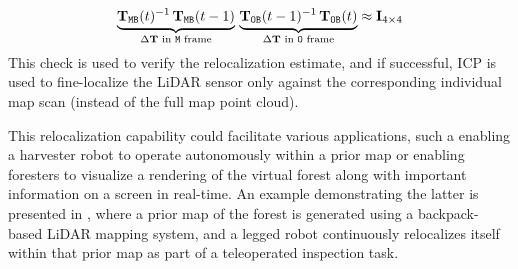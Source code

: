 \begin{equation}
  \label{eq:cycle-relocalization}
  \underbrace{\mathbf{T}_{\mathtt{M}\mathtt{B}}(t)^{-1}\, \mathbf{T}_{\mathtt{M}\mathtt{B}}(t-1)}_{\Delta\mathbf{T} \text{ in $\mathtt{M}$ frame}}  \, \underbrace{ \mathbf{T}_{\mathtt{O}\mathtt{B}}(t-1)^{-1}\,  \mathbf{T}_{\mathtt{O}\mathtt{B}}(t)}_{\Delta\mathbf{T} \text{ in $\mathtt{O}$ frame}} \approx \mathbf{I}_{4\times4}
\end{equation}
This check is used to verify the relocalization estimate, and if successful, ICP is used to fine-localize the LiDAR sensor only against the corresponding individual map scan (instead of the full map point cloud).


This relocalization capability could facilitate various applications, such a enabling a harvester robot to operate autonomously within a prior map or enabling foresters to visualize a rendering of the virtual forest along with important information on a screen in real-time. An example demonstrating the latter is presented in , where a prior map of the forest is generated using a backpack-based LiDAR mapping system, and a legged robot continuously relocalizes itself within that prior map as part of a teleoperated inspection task.












